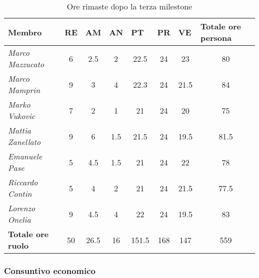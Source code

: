 \begin{table}[H]
    \centering
    \begin{tabular}{|l|c|c|c|c|c|c|c|}
    \hline
    \textbf{Membro} & \multicolumn{1}{l|}{\textbf{RE}} & \multicolumn{1}{l|}{\textbf{AM}} & \multicolumn{1}{l|}{\textbf{AN}} & \multicolumn{1}{l|}{\textbf{PT}} & \multicolumn{1}{l|}{\textbf{PR}} & \multicolumn{1}{l|}{\textbf{VE}} & \multicolumn{1}{l|}{\textbf{Totale ore persona}} \\ \hline
    \textit{Marco Mazzucato}  & 6  & 2.5  & 2    & 22.5  & 24  & 23     & 80     \\ \hline
    \textit{Marco Mamprin}    & 9  & 3    & 4    & 22.3  & 24  & 21.5   & 84     \\ \hline
    \textit{Marko Vukovic}    & 7  & 2    & 1    & 21    & 24  & 20     & 75     \\ \hline
    \textit{Mattia Zanellato} & 9  & 6    & 1.5  & 21.5  & 24  & 19.5   & 81.5   \\ \hline
    \textit{Emanuele Pase}    & 5  & 4.5  & 1.5  & 21    & 24  & 22     & 78     \\ \hline
    \textit{Riccardo Contin}  & 5  & 4    & 2    & 21    & 24  & 21.5   & 77.5   \\ \hline
    \textit{Lorenzo Onelia}   & 9  & 4.5  & 4    & 22    & 24  & 19.5   & 83     \\ \hline
    \textbf{Totale ore ruolo} & 50 & 26.5 & 16   & 151.5 & 168 & 147    & 559    \\ \hline
    \end{tabular}
    \caption{Ore rimaste dopo la terza milestone}
\end{table}

\subsubsection{Consuntivo economico}

